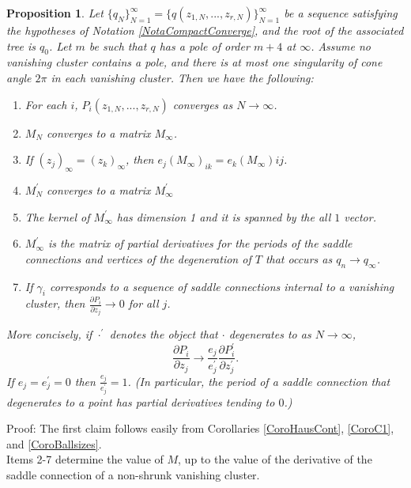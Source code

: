 \documentclass[12pt]{article}
\newtheorem{proposition}[theorem]{Proposition}
\begin{document}
\begin{proposition}\label{PropClustermodels} Let $\{q_N\}_{N = 1}^\infty = \{q(z_{1,N},...,z_{r,N})\}_{N=1}^\infty$ be a sequence satisfying the hypotheses of Notation \ref{NotaCompactConverge}, and the root of the associated tree is $q_0$. Let $m$ be such that $q$ has a pole of order $m+4$ at $\infty$. Assume no vanishing cluster contains a pole, and there is at most one singularity of cone angle $2\pi$ in each vanishing cluster. Then we have the following:\begin{enumerate}
\item For each $i$, $P_i(z_{1,N},...,z_{r,N})$ converges as $N \to \infty$.
\item $M_N$ converges to a matrix $M_\infty$.
\item If $(z_j)_\infty = (z_k)_\infty$, then $e_j(M_\infty)_{ik} = e_k (M_\infty){ij}$.
\item $M_N^\prime$ converges to a matrix $M_\infty^\prime$
\item The kernel of $M_\infty^\prime$ has dimension 1 and it is spanned by the all $1$ vector.
\item $M_\infty^\prime$ is the matrix of partial derivatives for the periods of the saddle connections and vertices of the degeneration of $T$ that occurs as $q_n \to q_\infty$.\\
\item If $\gamma_i$ corresponds to a sequence of saddle connections internal to a vanishing cluster, then $\frac{\partial P_i}{\partial z_j} \to 0$ for all $j$.
\end{enumerate}

More concisely, if $\cdot^\prime$ denotes the object that $\cdot$ degenerates to as $N \to \infty$, $$\frac{\partial P_i}{\partial z_j} \to \frac{e_j}{e_j^\prime}\frac{\partial P_i^\prime}{\partial z_j^\prime}.$$ If $e_j = e_j^\prime = 0$ then $\frac{e_j}{e_j^\prime} = 1$. (In particular, the period of a saddle connection that degenerates to a point has partial derivatives tending to $0$.) \end{proposition}

\noindent Proof: The first claim follows easily from Corollaries \ref{CoroHausCont}, \ref{CoroC1}, and \ref{CoroBallsizes}.\\

\noindent Items 2-7 determine the value of $M$, up to the value of the derivative of the saddle connection of a non-shrunk vanishing cluster.\\
\end{document}

